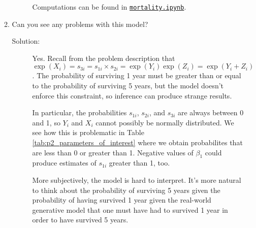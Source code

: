 \documentclass[letterpaper,11pt]{article}
\begin{document}
\begin{enumerate}
\begin{enumerate}
\begin{description}
    Computations can be found in
    \href{http://nbviewer.jupyter.org/github/ppham27/stat570/blob/master/midterm/mortality.ipynb}{\texttt{mortality.ipynb}}.
  \end{description}
\item Can you see any problems with this model?
  \begin{description}
  \item[Solution:] Yes. Recall from the problem description that
    $\exp\left(X_i\right) = s_{3i} = s_{1i} \times s_{2i} =
    \exp\left(Y_i\right)\exp\left(Z_i\right) = \exp\left(Y_i + Z_i\right)$. The
    probability of surviving 1 year must be greater than or equal to the
    probability of surviving 5 years, but the model doesn't enforce this
    constraint, so inference can produce strange results.

    In particular, the probabilities $s_{1i}$, $s_{2i}$, and $s_{3i}$ are always
    between 0 and 1, so $Y_i$ and $X_i$ cannot possibly be normally
    distributed. We see how this is problematic in Table
    \ref{tab:p2_parameters_of_interest} where we obtain probabilites that are
    less than 0 or greater than 1. Negative values of $\beta_1$ could produce
    estimates of $s_{1i}$ greater than 1, too.

    More subjectively, the model is hard to interpret. It's more natural to
    think about the probability of surviving 5 years given the probability of
    having survived 1 year given the real-world generative model that one must
    have had to survived 1 year in order to have survived 5 years.
  \end{description}  
\end{enumerate}
\end{enumerate}
\end{document}
